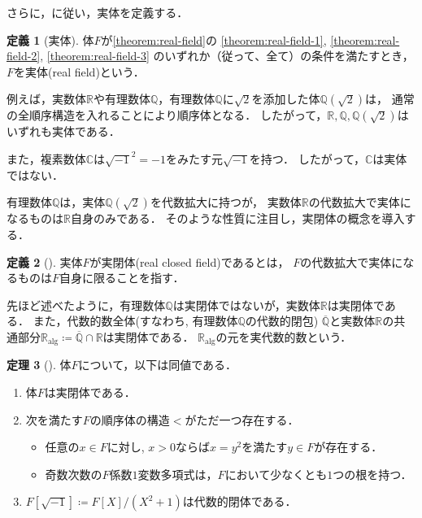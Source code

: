 \documentclass[uplatex, dvipdfmx]{jsarticle}
\numberwithin{equation}{section}
\newcommand{\R}{\mathbb{R}}
\newcommand{\Q}{\mathbb{Q}}
\newcommand{\C}{\mathbb{C}}
\newcommand{\Ralg}{\mathbb{R}_\mathrm{alg}}
\theoremstyle{definition}
\newtheorem{definition}{定義}[section]
\newtheorem{theorem}[definition]{定理}
\begin{document}
さらに，\cite[Definition 1.1.9.]{MR1659509}に従い，実体を定義する．

\begin{definition}[実体]
     体$F$が\cref{theorem:real-field}の
     \ref{theorem:real-field-1},
     \ref{theorem:real-field-2},
     \ref{theorem:real-field-3}
     のいずれか（従って、全て）の条件を満たすとき，
     $F$を実体(real field)という．
\end{definition}


例えば，実数体$\R$や有理数体$\Q$，有理数体$\Q$に$\sqrt{2}$を添加した体$\Q\left(\sqrt{2}\right)$は，
通常の全順序構造を入れることにより順序体となる．
したがって，$\R, \Q, \Q\left(\sqrt{2}\right)$はいずれも実体である．

また，複素数体$\C$は$\sqrt{-1}^2 = -1$をみたす元$\sqrt{-1}$を持つ．
したがって，$\C$は実体ではない．

有理数体$\Q$は，実体$\Q\left(\sqrt{2}\right)$を代数拡大に持つが，
実数体$\R$の代数拡大で実体になるものは$\R$自身のみである．
そのような性質に注目し，実閉体の概念を導入する．

\begin{definition}[{\cite[Section I]{MR3069467}}] \label{definition:RCF}
     実体$F$が実閉体(real closed field)であるとは，
     $F$の代数拡大で実体になるものは$F$自身に限ることを指す．
\end{definition}

先ほど述べたように，有理数体$\Q$は実閉体ではないが，実数体$\R$は実閉体である．
また，代数的数全体(すなわち, 有理数体$\Q$の代数的閉包) $\overline{\Q}$と実数体$\R$の共通部分$\Ralg \coloneqq \overline{\Q} \cap \R$は実閉体である．
$\Ralg$の元を実代数的数という．

\begin{theorem}[{\cite[S\"{a}tze 1--3]{MR3069467}}] \label{theorem:real-closed-field}
     体$F$について，以下は同値である．
     \begin{enumerate}
          \item 体$F$は実閉体である．
          \item 次を満たす$F$の順序体の構造$<$がただ一つ存在する．
               \begin{itemize}
                    \item 任意の$x \in F$に対し, $x>0$ならば$x = y^2$を満たす$y \in F$が存在する．
                    \item 奇数次数の$F$係数$1$変数多項式は，$F$において少なくとも$1$つの根を持つ．
               \end{itemize}
          \item $F\left[\sqrt{-1}\right] \coloneqq F[X]/(X^2 + 1)$は代数的閉体である．
     \end{enumerate}
\end{theorem}
\end{document}

